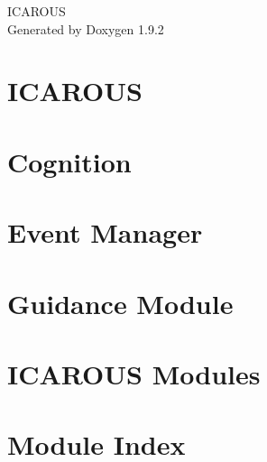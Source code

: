 \documentclass[twoside]{book}
\newcommand{\+}{\discretionary{\mbox{\scriptsize$\hookleftarrow$}}{}{}}
\newcommand{\clearemptydoublepage}{%
    \newpage{\pagestyle{empty}\cleardoublepage}%
  }
\begin{document}
  \raggedbottom
    \hypersetup{pageanchor=false,
                bookmarksnumbered=true,
                pdfencoding=unicode
               }
  \begin{titlepage}
  \vspace*{7cm}
  \begin{center}%
  {\Large ICAROUS}\\
  \vspace*{1cm}
  {\large Generated by Doxygen 1.9.2}\\
  \end{center}
  \end{titlepage}
  \clearemptydoublepage
  \tableofcontents
  \clearemptydoublepage
  \hypersetup{pageanchor=true}
\chapter{ICAROUS}
\label{index}\hypertarget{index}{}
\chapter{Cognition}
\label{md__modules__core__cognition__requirements_design}

\chapter{Event Manager}
\label{md__modules__core__event_manager__requirements_design}

\chapter{Guidance Module}
\label{md__modules__core__guidance__r_e_a_d_m_e}

\chapter{ICAROUS Modules}
\label{md__modules__r_e_a_d_m_e}

\chapter{Module Index}

\end{document}
